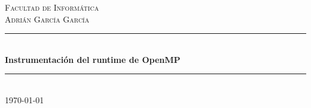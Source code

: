 \renewcommand\indexname{Índice}
\begin{titlepage}

\newcommand{\HRule}{\rule{\linewidth}{0.5mm}} %

\center %
 

\textsc{\LARGE Facultad de Informática}\\[1.5cm] %
\textsc{\large Adrián García García}\\[0.5cm] %

\newcommand*{\TitleFont}{%
      \usefont{\encodingdefault}{\rmdefault}{b}{n}%
      \fontsize{19}{23}%
      \selectfont}


\HRule \\[0.4cm]
{ \TitleFont \bfseries Instrumentación del runtime de OpenMP}\\[0.4cm] %
\HRule \\[1.5cm]
 




{\large \today}\\[2cm] %



\end{titlepage}
